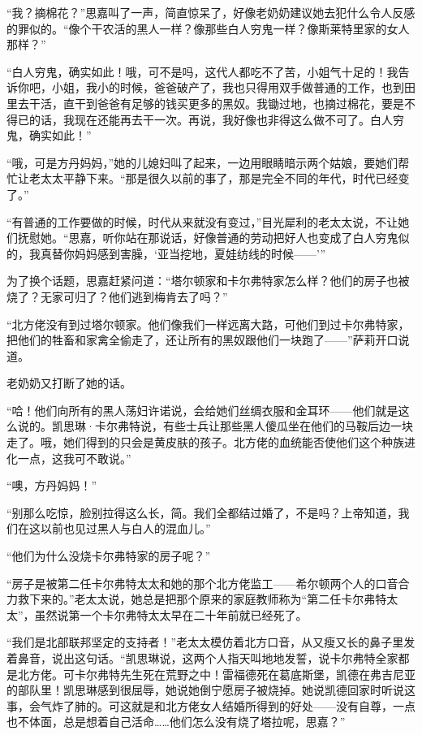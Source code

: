 \par “我？摘棉花？”思嘉叫了一声，简直惊呆了，好像老奶奶建议她去犯什么令人反感的罪似的。“像个干农活的黑人一样？像那些白人穷鬼一样？像斯莱特里家的女人那样？”
\par “白人穷鬼，确实如此！哦，可不是吗，这代人都吃不了苦，小姐气十足的！我告诉你吧，小姐，我小的时候，爸爸破产了，我也只得用双手做普通的工作，也到田里去干活，直干到爸爸有足够的钱买更多的黑奴。我锄过地，也摘过棉花，要是不得已的话，我现在还能再去干一次。再说，我好像也非得这么做不可了。白人穷鬼，确实如此！”
\par “哦，可是方丹妈妈，”她的儿媳妇叫了起来，一边用眼睛暗示两个姑娘，要她们帮忙让老太太平静下来。“那是很久以前的事了，那是完全不同的年代，时代已经变了。”
\par “有普通的工作要做的时候，时代从来就没有变过，”目光犀利的老太太说，不让她们抚慰她。“思嘉，听你站在那说话，好像普通的劳动把好人也变成了白人穷鬼似的，我真替你妈妈感到害臊，‘亚当挖地，夏娃纺线的时候——'”
\par 为了换个话题，思嘉赶紧问道：“塔尔顿家和卡尔弗特家怎么样？他们的房子也被烧了？无家可归了？他们逃到梅肯去了吗？”
\par “北方佬没有到过塔尔顿家。他们像我们一样远离大路，可他们到过卡尔弗特家，把他们的牲畜和家禽全偷走了，还让所有的黑奴跟他们一块跑了——”萨莉开口说道。
\par 老奶奶又打断了她的话。
\par “哈！他们向所有的黑人荡妇许诺说，会给她们丝绸衣服和金耳环——他们就是这么说的。凯思琳·卡尔弗特说，有些士兵让那些黑人傻瓜坐在他们的马鞍后边一块走了。哦，她们得到的只会是黄皮肤的孩子。北方佬的血统能否使他们这个种族进化一点，这我可不敢说。”
\par “噢，方丹妈妈！”
\par “别那么吃惊，脸别拉得这么长，简。我们全都结过婚了，不是吗？上帝知道，我们在这以前也见过黑人与白人的混血儿。”
\par “他们为什么没烧卡尔弗特家的房子呢？”
\par “房子是被第二任卡尔弗特太太和她的那个北方佬监工——希尔顿两个人的口音合力救下来的。”老太太说，她总是把那个原来的家庭教师称为“第二任卡尔弗特太太”，虽然说第一个卡尔弗特太太早在二十年前就已经死了。
\par “我们是北部联邦坚定的支持者！”老太太模仿着北方口音，从又瘦又长的鼻子里发着鼻音，说出这句话。“凯思琳说，这两个人指天叫地地发誓，说卡尔弗特全家都是北方佬。可卡尔弗特先生死在荒野之中！雷福德死在葛底斯堡，凯德在弗吉尼亚的部队里！凯思琳感到很屈辱，她说她倒宁愿房子被烧掉。她说凯德回家时听说这事，会气炸了肺的。可这就是和北方佬女人结婚所得到的好处——没有自尊，一点也不体面，总是想着自己活命……他们怎么没有烧了塔拉呢，思嘉？”

